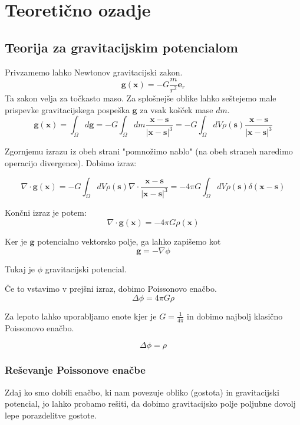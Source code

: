 \documentclass{article}
\theoremstyle{definition}
\theoremstyle{plain}
\numberwithin{definition}{section}
\numberwithin{theorem}{section}
\begin{document}
\section{Teoretično ozadje}
\subsection{Teorija za gravitacijskim potencialom}
Privzamemo lahko Newtonov gravitacijski zakon.
$$\boldsymbol{g}(\boldsymbol{x}) = -G \frac{m}{r^{2}} \boldsymbol{e}_{r}$$
Ta zakon velja za točkasto maso. 
Za splošnejše oblike lahko seštejemo male prispevke
gravitacijskega pospeška $\boldsymbol{g}$ za vsak košček mase $dm$. 
$$\boldsymbol{g}(\boldsymbol{x}) = \int_{\Omega} d\boldsymbol{g} = 
-G \int_{\Omega} dm \frac{\boldsymbol{x} - \boldsymbol{s}}{|\boldsymbol{x} - \boldsymbol{s}|^{3}} = 
-G \int_{\Omega} dV \rho(\boldsymbol{s}) \frac{\boldsymbol{x} - \boldsymbol{s}}{|\boldsymbol{x} - \boldsymbol{s}|^{3}}$$


Zgornjemu izrazu iz obeh strani "pomnožimo nablo" (na obeh straneh naredimo
operacijo divergence). Dobimo izraz:

$$\nabla \cdot \boldsymbol{g}(\boldsymbol{x}) = 
-G \int_{\Omega} dV \rho(\boldsymbol{s}) \nabla \cdot \frac{\boldsymbol{x} - \boldsymbol{s}}{|\boldsymbol{x} - \boldsymbol{s}|^{3}} = - 4 \pi G \int_{\Omega} dV \rho(\boldsymbol{s}) \delta(\boldsymbol{x} - \boldsymbol{s})$$

Končni izraz je potem:
$$\nabla \cdot \boldsymbol{g}(\boldsymbol{x}) = -4 \pi G \rho(\boldsymbol{x})$$

Ker je $\boldsymbol{g}$ potencialno vektorsko polje, ga lahko zapišemo kot
$$\boldsymbol{g} = - \nabla \phi$$

Tukaj je $\phi$ gravitacijski potencial.

Če to vstavimo v prejšni izraz, dobimo Poissonovo enačbo.
$$\Delta \phi = 4 \pi G \rho$$

Za lepoto lahko uporabljamo enote kjer je $G = \frac{1}{4 \pi}$ in dobimo najbolj
klasično Poissonovo enačbo.

$$\Delta \phi = \rho$$

\subsubsection{Reševanje Poissonove enačbe}
Zdaj ko smo dobili enačbo, ki nam povezuje obliko (gostota)
in gravitacijski potencial, jo lahko probamo rešiti, da dobimo 
gravitacijsko polje poljubne dovolj lepe porazdelitve gostote.
\end{document}
